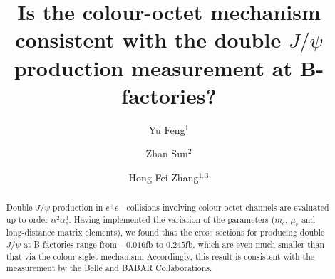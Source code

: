 \documentclass[preprint,showpacs,preprintnumbers,amssymb,aps]{revtex4}
\begin{document}
\normalsize

\title{Is the colour-octet mechanism consistent with the double $J/\psi$ production measurement at B-factories?}

\author{Yu Feng$^1$}
\author{Zhan Sun$^2$}
\author{Hong-Fei Zhang$^{1, 3}$}

\begin{abstract}
Double $J/\psi$ production in $e^+e^-$ collisions involving colour-octet channels are evaluated up to order $\alpha^2\alpha_s^3$.
Having implemented the variation of the parameters ($m_c$, $\mu_r$ and long-distance matrix elements),
we found that the cross sections for producing double $J/\psi$ at B-factories range from $-0.016$fb to $0.245$fb,
which are even much smaller than that via the colour-siglet mechanism.
Accordingly, this result is consistent with the measurement by the Belle and BABAR Collaborations.
\end{abstract}


\maketitle
\end{document}
